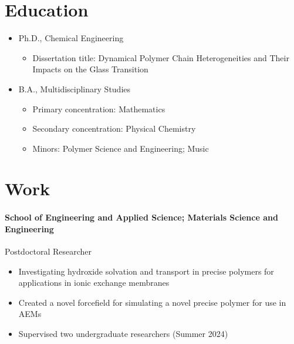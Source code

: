 \documentclass{my_cv}
\begin{document}

\section{Education}
\begin{itemize}
    \item Ph.D., Chemical Engineering
    \begin{itemize}
        \item Dissertation title: Dynamical Polymer Chain Heterogeneities and Their Impacts on the Glass Transition
    \end{itemize}
\end{itemize}
\begin{itemize}
    \item B.A., Multidisciplinary Studies
    \begin{itemize}
        \item Primary concentration: Mathematics
        \item Secondary concentration: Physical Chemistry
    \item Minors: Polymer Science and Engineering; Music
    \end{itemize}
\end{itemize}

\section{Work}
\paragraph{School of Engineering and Applied Science; Materials Science and Engineering\\}
Post\-doctoral Researcher
\begin{itemize}
    \item Investigating hydroxide solvation and transport in precise polymers for applications in ionic exchange membranes
    \item Created a novel force\-field for simulating a novel precise polymer for use in AEMs 
    \item Supervised two undergraduate researchers (Summer 2024)
\end{itemize}
\end{document}
